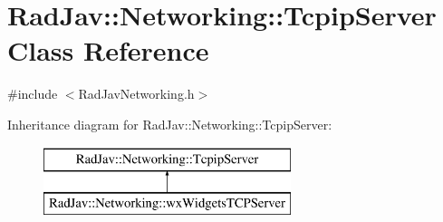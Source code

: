 \hypertarget{class_rad_jav_1_1_networking_1_1_tcpip_server}{}\section{Rad\+Jav\+:\+:Networking\+:\+:Tcpip\+Server Class Reference}
\label{class_rad_jav_1_1_networking_1_1_tcpip_server}


{\ttfamily \#include $<$Rad\+Jav\+Networking.\+h$>$}

Inheritance diagram for Rad\+Jav\+:\+:Networking\+:\+:Tcpip\+Server\+:\begin{figure}[H]
\begin{center}
\leavevmode
\includegraphics[height=2.000000cm]{class_rad_jav_1_1_networking_1_1_tcpip_server}
\end{center}
\end{figure}
